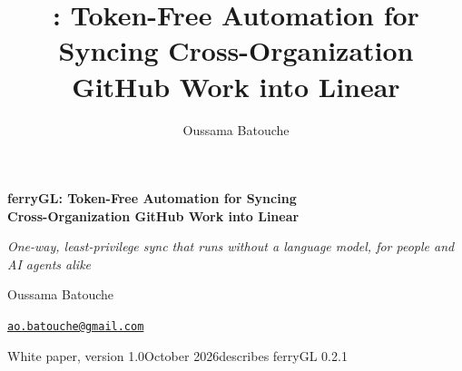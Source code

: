 \documentclass[11pt,a4paper]{article}
\title{\ferry: Token-Free Automation for Syncing Cross-Organization GitHub Work into Linear}
\author{Oussama Batouche}
\date{\paperdate}
\newcommand{\ferry}{ferryGL}
\newcommand{\version}{0.2.1}
\newcommand{\paperversion}{1.0}
\newcommand{\paperdate}{October 2026}
\begin{document}
\thispagestyle{plain}
\begin{center}
  \vspace*{0.4cm}
  {\LARGE\bfseries \ferry: Token-Free Automation for Syncing\\[3pt]
   Cross-Organization GitHub Work into Linear\par}
  \vspace{0.3cm}
  {\large\itshape\color{fgMuted} One-way, least-privilege sync that runs without a language model, for people and AI agents alike\par}
  \vspace{0.55cm}
  {\large Oussama Batouche\par}
  \vspace{0.15cm}
  {\small\href{mailto:ao.batouche@gmail.com}{\nolinkurl{ao.batouche@gmail.com}}\par}
  \vspace{0.3cm}
  {\small\color{fgMuted}White paper, version \paperversion\quad\textbullet\quad \paperdate\quad\textbullet\quad describes \ferry{} \version\par}
\end{center}
\vspace{0.3cm}
\end{document}
